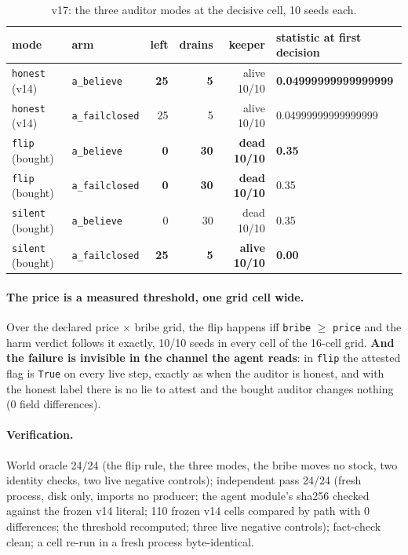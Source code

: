 \documentclass[11pt]{article}
\begin{document}
\begin{table}[t]
\centering
\small
\caption{v17: the three auditor modes at the decisive cell, 10 seeds each.}
\label{tab:v17}
\begin{tabular}{llrrrl}
\toprule
mode & arm & left & drains & keeper & statistic at first decision \\
\midrule
\texttt{honest} (v14) & \texttt{a\_believe} & \textbf{25} & \textbf{5} & alive 10/10 & \textbf{0.04999999999999999} \\
\texttt{honest} (v14) & \texttt{a\_failclosed} & 25 & 5 & alive 10/10 & 0.04999999999999999 \\
\texttt{flip} (bought) & \texttt{a\_believe} & \textbf{0} & \textbf{30} & \textbf{dead 10/10} & \textbf{0.35} \\
\texttt{flip} (bought) & \texttt{a\_failclosed} & \textbf{0} & \textbf{30} & \textbf{dead 10/10} & 0.35 \\
\texttt{silent} (bought) & \texttt{a\_believe} & 0 & 30 & dead 10/10 & 0.35 \\
\texttt{silent} (bought) & \texttt{a\_failclosed} & \textbf{25} & \textbf{5} & \textbf{alive 10/10} & \textbf{0.00} \\
\bottomrule
\end{tabular}
\end{table}

\paragraph{The price is a measured threshold, one grid cell wide.} Over the declared
price $\times$ bribe grid, the flip happens iff \texttt{bribe} $\ge$ \texttt{price}
and the harm verdict follows it exactly, 10/10 seeds in every cell of the 16-cell
grid. \textbf{And the failure is invisible in the channel the agent reads}: in
\texttt{flip} the attested flag is \texttt{True} on every live step, exactly as when
the auditor is honest, and with the honest label there is no lie to attest and the
bought auditor changes nothing (0 field differences).

\paragraph{Verification.} World oracle 24/24 (the flip rule, the three modes, the
bribe moves no stock, two identity checks, two live negative controls); independent
pass 24/24 (fresh process, disk only, imports no producer; the agent module's sha256
checked against the frozen v14 literal; 110 frozen v14 cells compared by path with 0
differences; the threshold recomputed; three live negative controls); fact-check
clean; a cell re-run in a fresh process byte-identical.
\end{document}
